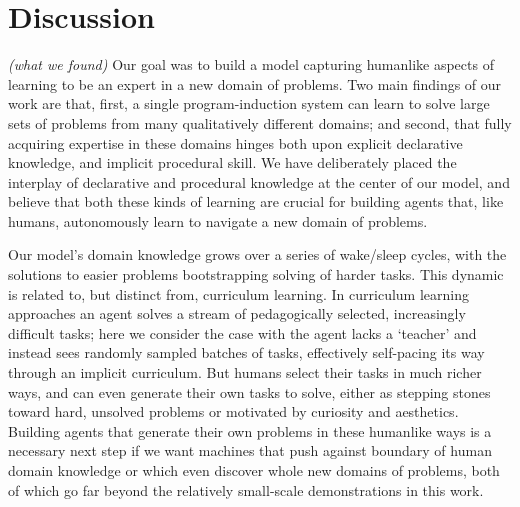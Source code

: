 \documentclass{article}
\newcommand{\systemEnding}{\textsc{DreamCoder}}
\begin{document}


\section{Discussion}

\emph{(what we found)} Our goal was to build a model capturing
humanlike aspects of learning to be an expert in a new domain of
problems.  Two main findings of our work are that, first, a single
program-induction system can learn to solve large sets of problems
from many qualitatively different domains; and second, that fully
acquiring expertise in these domains hinges both upon explicit
declarative knowledge, and implicit procedural skill.  We have
deliberately placed the interplay of declarative and procedural
knowledge at the center of our model, and believe that both these
kinds of learning are crucial for building agents that, like humans,
autonomously learn to navigate a new domain of problems.

Our model's domain knowledge grows over a series of wake/sleep cycles,
with the solutions to easier problems bootstrapping
solving of harder tasks.
This dynamic is related to, but distinct from, curriculum learning. In curriculum learning approaches an agent solves a stream of pedagogically selected, increasingly difficult tasks; here we consider the case with the agent lacks a `teacher' and instead sees randomly sampled batches of tasks, effectively self-pacing its way through an implicit curriculum.
But humans select their tasks in much richer ways,
and can even generate their own tasks to solve,
either as stepping stones toward hard, unsolved problems or motivated by curiosity and aesthetics.
Building agents that generate their own problems in these humanlike ways is a necessary next step
if we want machines that push against boundary of human domain knowledge or which even discover whole new domains of problems,
both of which go far beyond the relatively small-scale demonstrations in this work.
\end{document}

